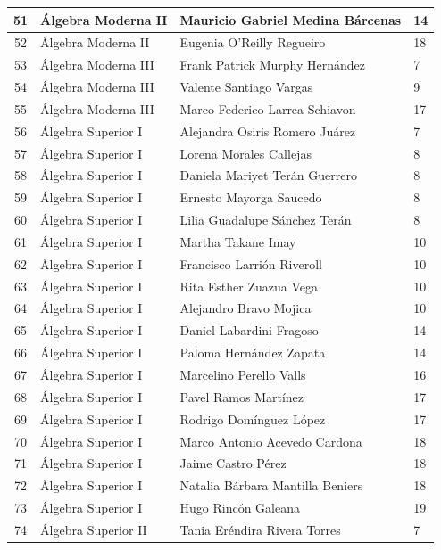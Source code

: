 {\begin{longtable}{|c|p{6.5cm}|p{5cm}|p{1.5cm}|}
51 & Álgebra Moderna II & Mauricio Gabriel Medina Bárcenas & 14 \\ \hline
52 & Álgebra Moderna II & Eugenia O'Reilly Regueiro & 18 \\ \hline
  53 & Álgebra Moderna III & Frank Patrick Murphy Hernández & 7 \\ \hline
  54 & Álgebra Moderna III & Valente Santiago Vargas & 9 \\ \hline
  55 & Álgebra Moderna III & Marco Federico Larrea Schiavon & 17 \\ \hline
  56 & Álgebra Superior I & Alejandra Osiris Romero Juárez & 7 \\ \hline
  57 & Álgebra Superior I & Lorena Morales Callejas & 8 \\ \hline
  58 & Álgebra Superior I & Daniela Mariyet Terán Guerrero & 8 \\ \hline
  59 & Álgebra Superior I & Ernesto Mayorga Saucedo & 8 \\ \hline
  60 & Álgebra Superior I & Lilia Guadalupe Sánchez Terán & 8 \\ \hline
  61 & Álgebra Superior I & Martha Takane Imay & 10 \\ \hline
  62 & Álgebra Superior I & Francisco Larrión Riveroll & 10 \\ \hline
  63 & Álgebra Superior I & Rita Esther Zuazua Vega & 10 \\ \hline
  64 & Álgebra Superior I & Alejandro Bravo Mojica & 10 \\ \hline
  65 & Álgebra Superior I & Daniel Labardini Fragoso & 14 \\ \hline
  66 & Álgebra Superior I & Paloma Hernández Zapata & 14 \\ \hline
  67 & Álgebra Superior I & Marcelino Perello Valls & 16 \\ \hline
  68 & Álgebra Superior I & Pavel Ramos Martínez & 17 \\ \hline
  69 & Álgebra Superior I & Rodrigo Domínguez López & 17 \\ \hline
  70 & Álgebra Superior I & Marco Antonio Acevedo Cardona & 18 \\ \hline
  71 & Álgebra Superior I & Jaime Castro Pérez & 18 \\ \hline
  72 & Álgebra Superior I & Natalia Bárbara Mantilla Beniers & 18 \\ \hline
  73 & Álgebra Superior I & Hugo Rincón Galeana & 19 \\ \hline
  74 & Álgebra Superior II & Tania Eréndira Rivera Torres & 7 \\ \hline

\end{longtable}}
